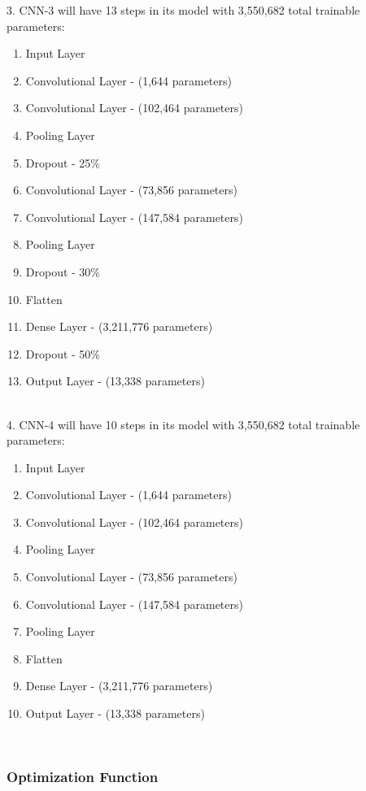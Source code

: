 \documentclass[5p,authoryear]{elsarticle}
\begin{document}
3.	CNN-3 will have 13 steps in its model with 3,550,682 total trainable parameters:

\begin{enumerate}
 \item Input Layer
 \item Convolutional Layer - (1,644 parameters)
 \item Convolutional Layer - (102,464 parameters)
 \item Pooling Layer
 \item Dropout - 25\%
 \item Convolutional Layer - (73,856 parameters)
 \item Convolutional Layer - (147,584 parameters)
 \item Pooling Layer
 \item Dropout - 30\%
 \item Flatten
 \item Dense Layer - (3,211,776 parameters)
 \item Dropout - 50\%
 \item Output Layer - (13,338 parameters)
\end{enumerate} \\


4.	CNN-4 will have 10 steps in its model with 3,550,682 total trainable parameters:

\begin{enumerate}
 \item Input Layer
 \item Convolutional Layer - (1,644 parameters)
 \item Convolutional Layer - (102,464 parameters)
 \item Pooling Layer
 \item Convolutional Layer - (73,856 parameters)
 \item Convolutional Layer - (147,584 parameters)
 \item Pooling Layer
 \item Flatten
 \item Dense Layer - (3,211,776 parameters)
 \item Output Layer - (13,338 parameters)
\end{enumerate} \\




\subsubsection{Optimization Function}
\end{document}
